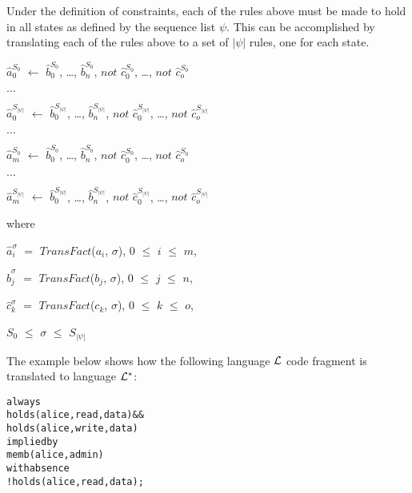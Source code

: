 \documentclass[11pt, twocolumn]{article}
\newenvironment{vquote}
  {\begin{list}{}{\leftmargin 1em}\item[]}
  {\end{list}}
\newenvironment{vverbatim}
  {\begin{alltt}}
  {\vspace{-\baselineskip}\end{alltt}}
\begin{document}
          Under the definition of constraints, each of the rules above must be
          made to hold in all states as defined by the sequence list $\psi$.
          This can be accomplished by translating each of the rules above to
          a set of $|\psi|$ rules, one for each state.

           \begin{vquote}
            $\hat{a}^{S_{0}}_{0}$ $\leftarrow$
            $\hat{b}^{S_{0}}_{0}$, \ldots, $\hat{b}^{S_{0}}_{n}$,
            $not$ $\hat{c}^{S_{0}}_{0}$, \ldots, $not$ $\hat{c}^{S_{0}}_{o}$

            $\ldots$

            $\hat{a}^{S_{|\psi|}}_{0}$ $\leftarrow$
            $\hat{b}^{S_{|\psi|}}_{0}$, \ldots, $\hat{b}^{S_{|\psi|}}_{n}$,
            $not$ $\hat{c}^{S_{|\psi|}}_{0}$, \ldots, $not$ $\hat{c}^{S_{|\psi|}}_{o}$

            $\ldots$

            $\hat{a}^{S_{0}}_{m}$ $\leftarrow$
            $\hat{b}^{S_{0}}_{0}$, \ldots, $\hat{b}^{S_{0}}_{n}$,
            $not$ $\hat{c}^{S_{0}}_{0}$, \ldots, $not$ $\hat{c}^{S_{0}}_{o}$

            $\ldots$

            $\hat{a}^{S_{|\psi|}}_{m}$ $\leftarrow$
            $\hat{b}^{S_{|\psi|}}_{0}$, \ldots, $\hat{b}^{S_{|\psi|}}_{n}$,
            $not$ $\hat{c}^{S_{|\psi|}}_{0}$, \ldots, $not$ $\hat{c}^{S_{|\psi|}}_{o}$

            where

            $\hat{a}^{\sigma}_{i}$ $=$ $TransFact$($a_{i}$, $\sigma$),
            $0$ $\leq$ $i$ $\leq$ $m$,

            $\hat{b}^{\sigma}_{j}$ $=$ $TransFact$($b_{j}$, $\sigma$),
            $0$ $\leq$ $j$ $\leq$ $n$,

            $\hat{c}^{\sigma}_{k}$ $=$ $TransFact$($c_{k}$, $\sigma$),
            $0$ $\leq$ $k$ $\leq$ $o$,

            $S_{0}$ $\leq$ $\sigma$ $\leq$ $S_{|\psi|}$
          \end{vquote}

          The example below shows how the following language ${\cal L}$ code
          fragment is translated to language ${\cal L}^{*}$:

          \begin{vverbatim}
  always
    holds(alice, read, data) &&
    holds(alice, write, data)
  implied by
    memb(alice, admin)
  with absence
    !holds(alice, read, data);
          \end{vverbatim}
\end{document}
